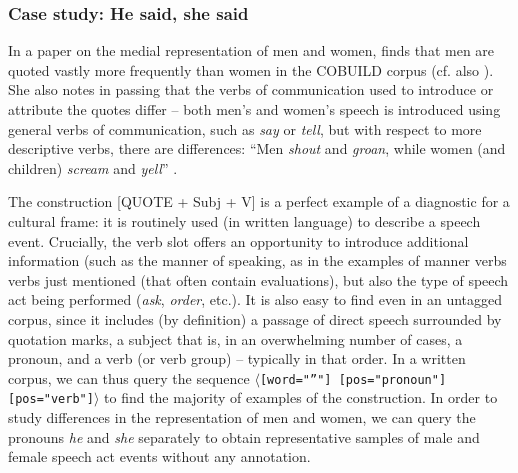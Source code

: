 \subsubsection{Case study: He said, she said}
\label{sec:hesaidshesaid}

In a paper on the medial representation of men and women,  \citet{caldas-coulthard_discourse_1993} finds that men are quoted vastly more frequently than women in the COBUILD corpus (cf. also ). She also notes in passing that the verbs  of communication used to introduce or attribute the quotes differ -- both men's and women's speech is introduced using general verbs of communication, such as \textit{say} or \textit{tell}, but with respect to more descriptive verbs, there are differences: ``Men \textit{shout} and \textit{groan}, while women (and children) \textit{scream } and \textit{yell}'' \citep[204]{caldas-coulthard_discourse_1993}.

The construction [QUOTE + Subj + V] is a perfect example of a diagnostic for a cultural  frame: it is routinely used (in written  language) to describe a speech event. Crucially, the verb  slot offers an opportunity to introduce additional information (such as the manner of speaking, as in the examples of manner verbs verbs just mentioned (that often contain evaluations), but also the type of speech act being performed (\textit{ask}, \textit{order}, etc.). It is also easy to find even in an untagged  corpus, since it includes (by definition) a passage of direct speech surrounded by quotation marks, a subject that is, in an overwhelming number of cases, a pronoun,  and a verb (or verb  group) -- typically in that order. In a written  corpus, we can thus query the sequence $\langle$\texttt{[word="{''}"] [pos="pronoun"] [pos="verb"]}$\rangle$ to find the majority of examples of the construction. In order to study differences in the representation of men and women,  we can query the pronouns \textit{he} and \textit{she} separately to obtain representative  samples of male and female speech act events without any  annotation.

